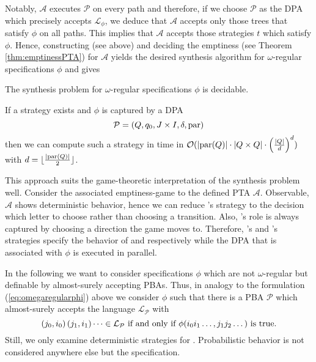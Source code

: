 Notably, $\mathcal{A}$ executes $\mathcal{P}$ on every path and therefore, if 
we choose $\mathcal{P}$ as the \ac{DPA} which precisely accepts 
$\mathcal{L}_{\phi}$, we deduce that $\mathcal{A}$ accepts only those trees 
that satisfy $\phi$ on all paths. This implies that $\mathcal{A}$ accepts those
strategies $t$ which satisfy $\phi$. Hence, constructing (see above) and 
deciding the emptiness (see Theorem \ref{thm:emptinessPTA}) for $\mathcal{A}$ 
yields the desired synthesis algorithm for $\omega$-regular specifications 
$\phi$ and gives
\begin{theorem}
  \cite[Theorem 21, Theorem 22]{AutoInfObj}
  The synthesis problem for $\omega$-regular specifications $\phi$ is
  decidable.

  If a strategy exists and $\phi$ is captured by a \ac{DPA}
  \begin{equation*}
    \mathcal{P} = \left(Q, q_{0}, J\times I, \delta, \operatorname{par}\right)
  \end{equation*}
  then we can compute such a strategy in time in 
  $\mathcal{O}(\left\vert{\operatorname{par}(Q)}\right\vert\cdot\left\vert{Q\times Q}\right\vert\cdot\left(
    \frac{\left\vert{Q}\right\vert}{d}\right)^{d})$ with 
  $d = \lfloor \frac{\left\vert{\operatorname{par}(Q)}\right\vert}{2} \rfloor$.
\end{theorem}
This approach suits the game-theoretic interpretation of the synthesis problem
well. Consider the associated emptiness-game to the defined \ac{PTA}
$\mathcal{A}$. Observable, $\mathcal{A}$ shows deterministic behavior, hence
we can reduce \eve{}'s strategy to the decision which letter to choose rather
than choosing a transition. Also, \adam{}'s role is always captured by choosing
a direction the game moves to. Therefore, \eve{}'s and \adam{}'s strategies
specify the behavior of \outputp{} and  respectively while the
\ac{DPA} that is associated with $\phi$ is executed in parallel.

In the following we want to consider specifications $\phi$ which are not
$\omega$-regular but definable by almost-surely accepting \acp{PBA}. Thus, in
analogy to the formulation (\ref{eq:omegaregularphi}) above we consider $\phi$
such that there is a \ac{PBA} $\mathcal{P}$ which almost-surely accepts the
language $\mathcal{L}_{\mathcal{P}}$ with
\begin{equation}
  \left(j_{0}, i_{0}\right)\left(j_{1}, i_{1}\right)\dots\in\mathcal{L}_{\mathcal{P}}
  \text{ if and only if }
  \phi(i_{0}i_{1}\dots, j_{1}j_{2}\dots)\text{ is true.}
  \label{eq:pbaregularphi}
\end{equation}
Still, we only examine deterministic strategies for \outputp{}. Probabilistic
behavior is not considered anywhere else but the specification.

